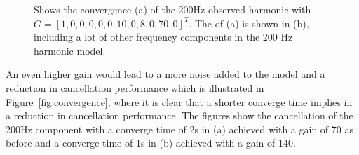 \begin{figure}[h!]
  \centering %
  \qquad
  \caption{\label{fig:ph_highgain} Shows the convergence (a) of the 200Hz observed harmonic with $G = [1, 0, 0, 0, 0, 0, 10, 0, 8, 0, 70, 0]^T$. The \abbrFFT of (a) is shown in (b), including a lot of other frequency components in the 200 Hz harmonic model.}
\end{figure}

\FloatBarrier
An even higher gain would lead to a more noise added to the model and a reduction in cancellation performance which is illustrated in Figure~\ref{fig:convergence}, where it is clear that a shorter converge time implies in a reduction in cancellation performance. The figures show the cancellation of the 200Hz component with a converge time of 2s in (a) achieved with a gain of 70 as before and a converge time of 1s in (b) achieved with a gain of 140.

